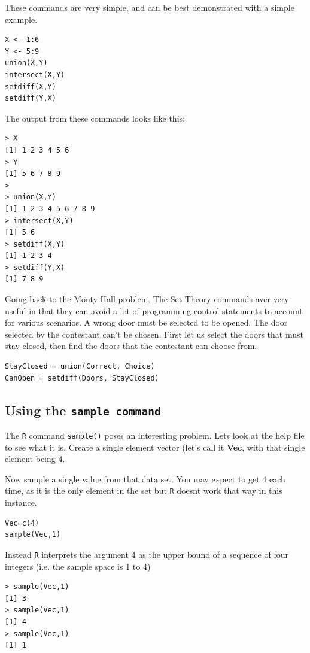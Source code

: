 \documentclass[11pt]{article} %
\begin{document}
These commands are very simple, and can be best demonstrated with a simple example.
\begin{framed}
\begin{verbatim}
X <- 1:6
Y <- 5:9
union(X,Y)
intersect(X,Y)
setdiff(X,Y)
setdiff(Y,X)
\end{verbatim}
\end{framed}
The output from these commands looks like this:
\begin{verbatim}
> X
[1] 1 2 3 4 5 6
> Y
[1] 5 6 7 8 9
>
> union(X,Y)
[1] 1 2 3 4 5 6 7 8 9
> intersect(X,Y)
[1] 5 6
> setdiff(X,Y)
[1] 1 2 3 4
> setdiff(Y,X)
[1] 7 8 9
\end{verbatim}
Going back to the Monty Hall problem. The Set Theory commands aver very useful in that they can avoid a lot of programming control statements to account for various scenarios. A wrong door must be selected to be opened. The door selected by the contestant can't be
chosen. First let us select the doors that must stay closed, then find the doors that the contestant can choose from.
\begin{framed}
\begin{verbatim}
StayClosed = union(Correct, Choice)
CanOpen = setdiff(Doors, StayClosed)
\end{verbatim}
\end{framed}
\newpage
\subsection{Using the \texttt{sample command}}


The \texttt{R} command \texttt{sample()} poses an interesting problem. Lets look at the help file to see what it is.
Create a single element vector (let's call it \textbf{Vec}, with that single element being 4. 

Now sample a single value from that data set. You may expect to get 4 each time, as it is the only element in the set but \texttt{R} doesnt work that way in this instance.
\begin{framed}
\begin{verbatim}
Vec=c(4)
sample(Vec,1)
\end{verbatim}
\end{framed}
Instead \texttt{R} interprets the argument 4 as the upper bound of a sequence of four integers (i.e. the sample space is 1 to 4)
\begin{verbatim}
> sample(Vec,1)
[1] 3
> sample(Vec,1)
[1] 4
> sample(Vec,1)
[1] 1
\end{verbatim}
\end{document}
